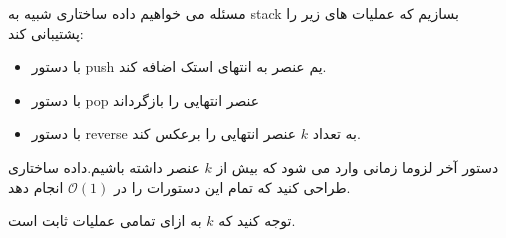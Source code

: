 ‌مسئله
می خواهیم داده ساختاری شبیه به stack بسازیم که عملیات های زیر را پشتیبانی کند:

\begin{itemize}
	\item 
	با دستور push یم عنصر به انتهای استک اضافه کند.
	\item
	با دستور pop عنصر انتهایی را بازگرداند
	\item
	با دستور reverse به تعداد $k$ عنصر انتهایی را برعکس کند.
\end{itemize}



دستور آخر لزوما زمانی وارد می شود که بیش از $k$ عنصر داشته باشیم.داده ساختاری طراحی کنید که تمام این دستورات را در 
$\mathcal{O}(1)$
 انجام دهد.

توجه کنید که $k$ به ازای تمامی عملیات‌ ثابت است.











